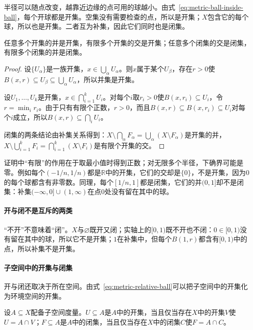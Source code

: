 半径可以随点改变，越靠近边缘的点可用的球越小。由式~\eqref{eq:metric-ball-inside-ball}，每个开球都是开集。空集没有需要检查的点，所以是开集；$X$包含它的每个球，所以也是开集。二者互为补集，因此它们同时也是闭集。

\begin{theorem}[开集与闭集的运算]
\label{thm:metric-open-operations}
任意多个开集的并是开集，有限多个开集的交是开集；任意多个闭集的交是闭集，有限多个闭集的并是闭集。
\end{theorem}

\begin{proof}
设$\{U_\alpha\}$是一族开集，$x\in\bigcup_\alpha U_\alpha$。则$x$属于某个$U_\beta$，存在$r>0$使$B(x,r)\subseteq U_\beta\subseteq\bigcup_\alpha U_\alpha$，所以并集是开集。

设$U_1,\dots,U_k$是开集，$x\in\bigcap_{i=1}^kU_i$。对每个$i$取$r_i>0$使$B(x,r_i)\subseteq U_i$，令$r=\min_ir_i$。由于只有有限个正数，$r>0$，而且$B(x,r)\subseteq B(x,r_i)\subseteq U_i$对每个$i$成立，所以$B(x,r)\subseteq\bigcap_iU_i$。

闭集的两条结论由补集关系得到：$X\setminus\bigcap_\alpha F_\alpha=\bigcup_\alpha(X\setminus F_\alpha)$是开集的并，$X\setminus\bigcup_{i=1}^kF_i=\bigcap_{i=1}^k(X\setminus F_i)$是有限个开集的交。
\end{proof}

证明中“有限”的作用在于取最小值时得到正数；对无限多个半径，下确界可能是零。例如每个$(-1/n,1/n)$都是$\mathbb R$中的开集，它们的交却是$\{0\}$，不是开集，因为$0$的每个球都含有非零数。同理，每个$[1/n,1]$都是闭集，它们的并$(0,1]$却不是闭集：补集$(-\infty,0]\cup(1,\infty)$在点$0$处没有留在其中的球。

\paragraph{开与闭不是互斥的两类}
“不开”不意味着“闭”。$X$与$\varnothing$既开又闭；实轴上的$[0,1)$既不开也不闭：$0\in[0,1)$没有留在其中的球，所以它不是开集；$1$在补集中，但每个$B(1,r)$都含有$[0,1)$中的点，所以补集不是开集。

\paragraph{子空间中的开集与闭集}
开与闭还取决于所在空间。由式~\eqref{eq:metric-relative-ball}可以把子空间中的开集化为环境空间的开集。

\begin{lemma}[子空间的开集与闭集]
\label{lem:metric-relative-open}
设$A\subseteq X$配备子空间度量。$U\subseteq A$是$A$中的开集，当且仅当存在$X$中的开集$V$使$U=A\cap V$；$F\subseteq A$是$A$中的闭集，当且仅当存在$X$中的闭集$C$使$F=A\cap C$。
\end{lemma}


